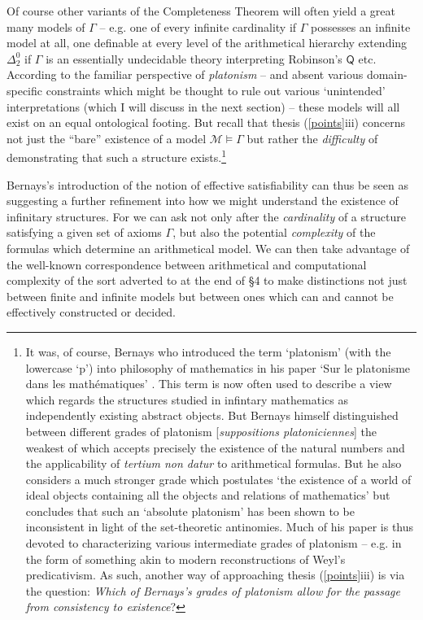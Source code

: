\documentclass[11pt,fleqn,leqno]{article}
\begin{document}
Of course other variants of the Completeness Theorem will often yield a great many models of $\Gamma$ -- e.g. one of every infinite cardinality if $\Gamma$ possesses an infinite model at all, one definable at every level of the arithmetical hierarchy extending $\Delta^0_2$ if $\Gamma$ is an essentially undecidable theory interpreting Robinson's $\mathsf{Q}$ etc.  According to the familiar perspective of \textsl{platonism} -- and absent various domain-specific constraints which might be thought to rule out various `unintended' interpretations (which I will discuss in the next section) -- these models will all exist on an equal ontological footing.   But recall that thesis (\ref{points}iii) concerns not just the ``bare'' existence of a model $\mathcal{M} \models \Gamma$ but rather the \textsl{difficulty} of demonstrating that such a structure exists.\footnote{It was, of course, Bernays  who introduced the term `platonism' (with the lowercase `p') into philosophy of mathematics in his paper `Sur le platonisme dans les math\'ematiques' \citeyearpar{Bernays1935}.  This term is now often used to describe a view which regards the structures studied in infintary mathematics as independently existing abstract objects.  But Bernays himself distinguished between different grades of platonism [\textsl{suppositions \guillemotleft platoniciennes\guillemotright}] the weakest of which accepts precisely the existence of the natural numbers and the applicability of \textsl{tertium non datur} to arithmetical formulas.  But he also considers a much stronger grade which postulates `the existence of a world of ideal objects containing all the objects and relations of mathematics' but concludes that such an `absolute platonism' has been shown to be inconsistent in light of the set-theoretic antinomies.  Much of his paper is thus devoted to characterizing various intermediate grades of platonism -- e.g. in the form of something akin to modern reconstructions of Weyl's predicativism.   As such, another way of approaching thesis (\ref{points}iii) is via the question: \textsl{Which of Bernays's grades of platonism allow for the passage from consistency to existence}?} 

Bernays's introduction of the notion of effective satisfiability can thus be seen as suggesting a further refinement into how we might understand the existence of infinitary structures.   For we can ask not only after the \textsl{cardinality} of a structure satisfying a given set of axioms $\Gamma$, but also the potential \textsl{complexity} of the formulas which determine an arithmetical model.   We can then take advantage of the well-known correspondence between arithmetical and computational complexity of the sort adverted to at the end of \S 4 to make distinctions not just between finite and infinite models but between ones which can and cannot be effectively constructed or decided.  
\end{document}
